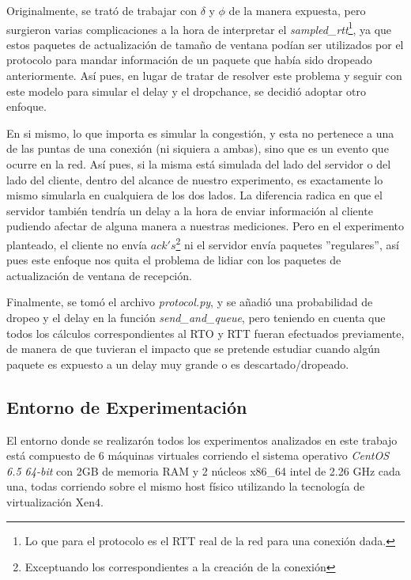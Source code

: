 \par Originalmente, se trat\'o de trabajar con $\delta$ y $\phi$ de la manera
expuesta, pero surgieron varias complicaciones a la hora de interpretar el
\emph{sampled\_rtt}\footnote{Lo que para el protocolo es el RTT real de la red
para una conexi\'on dada.}, ya que estos paquetes de actualizaci\'on de tama\~no
de ventana pod\'ian ser utilizados por el protocolo para mandar informaci\'on de
un paquete que hab\'ia sido dropeado anteriormente. As\'i pues, en lugar de
tratar de resolver este problema y seguir con este modelo para simular el delay
y el dropchance, se decidi\'o adoptar otro enfoque.

\par En si mismo, lo que importa es simular la congesti\'on, y esta no pertenece
a una de las puntas de una conexi\'on (ni siquiera a ambas), sino que es un
evento que ocurre en la red. As\'i pues, si la misma est\'a simulada del lado
del servidor o del lado del cliente, dentro del alcance de nuestro experimento,
es exactamente lo mismo simularla en cualquiera de los dos lados.  La diferencia
radica en que el servidor tambi\'en tendr\'ia un delay a la hora de enviar
informaci\'on al cliente pudiendo afectar de alguna manera a nuestras
mediciones. Pero en el experimento planteado, el cliente no env\'ia
$ack's$\footnote{Exceptuando los correspondientes a la creaci\'on de la
conexi\'on} ni el servidor env\'ia paquetes ''regulares'', as\'i pues este
enfoque nos quita el problema de lidiar con los paquetes de actualizaci\'on de
ventana de recepci\'on.

\par Finalmente, se tom\'o el archivo \emph{protocol.py}, y se a\~nadi\'o una
probabilidad de dropeo y el delay en la funci\'on \emph{send\_and\_queue}, pero
teniendo en cuenta que todos los c\'alculos correspondientes al RTO y RTT fueran
efectuados previamente, de manera de que tuvieran el impacto que se pretende
estudiar cuando alg\'un paquete es expuesto a un delay muy grande o es
descartado/dropeado.


\subsection{Entorno de Experimentaci\'on}\label{sec:experimento:entorno}
\par El entorno donde se realizar\'on todos los experimentos analizados en este
trabajo est\'a compuesto de 6 m\'aquinas virtuales corriendo el sistema
operativo \textit{CentOS 6.5 64-bit}\cite{centos} con 2GB de memoria RAM y 2
n\'ucleos x86\_64 intel de 2.26 GHz cada una, todas corriendo sobre el mismo
host f\'isico utilizando la tecnolog\'ia de virtualizaci\'on Xen4\cite{xen}.

